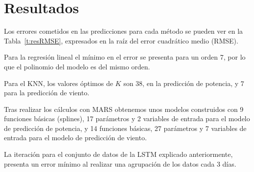 \documentclass[journal]{IEEEtran}
\begin{document}
 





%
%

\section{Resultados} 
Los errores cometidos en las predicciones para cada método se pueden ver en la Tabla~\ref{t:resRMSE}, expresados en la raíz del error cuadrático medio (RMSE).

Para la regresión lineal el mínimo en el error se presenta para un orden 7, por lo que el polinomio del modelo es del mismo orden.

Para el KNN, los valores óptimos de $K$ son $38$, en la predicción de potencia, y $7$ para la predicción de viento.

Tras realizar los cálculos con MARS obtenemos unos modelos construidos con 9 funciones básicas (splines), 17 parámetros  y 2 variables de entrada para el modelo de predicción de potencia, y 14 funciones básicas, 27 parámetros y 7 variables de entrada para el modelo de predicción de viento.

La iteración para el conjunto de datos de la LSTM explicado anteriormente, presenta un error mínimo al realizar una agrupación de los datos cada 3 días.
\end{document}
